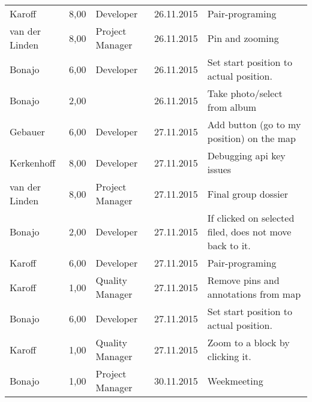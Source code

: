 \begin{longtable}{ l r p{2cm} c p{4cm} }
		Karoff                  & 8,00           & Developer             & 26.11.2015    & Pair-programing                                                                  \\
		van der Linden          & 8,00           & Project Manager       & 26.11.2015    & Pin and zooming                                                                 \\
		Bonajo                  & 6,00           & Developer             & 26.11.2015    & Set start position to actual position.                                          \\
		Bonajo                  & 2,00           &                       & 26.11.2015    & Take photo/select from album                                                    \\
		Gebauer                 & 6,00           & Developer             & 27.11.2015    & Add button (go to my position) on the map                                       \\
		Kerkenhoff              & 8,00           & Developer             & 27.11.2015    & Debugging api key issues                                                        \\
		van der Linden          & 8,00           & Project Manager       & 27.11.2015    & Final group dossier                                                             \\
		Bonajo                  & 2,00           & Developer             & 27.11.2015    & If clicked on selected filed, does not move back to it.                         \\
		Karoff                  & 6,00           & Developer             & 27.11.2015    & Pair-programing                                                                  \\
		Karoff                  & 1,00           & Quality Manager       & 27.11.2015    & Remove pins and annotations from map                                            \\
		Bonajo                  & 6,00           & Developer             & 27.11.2015    & Set start position to actual position.                                          \\
		Karoff                  & 1,00           & Quality Manager       & 27.11.2015    & Zoom to a block by clicking it.                                                 \\
		Bonajo                  & 1,00           & Project Manager       & 30.11.2015    & Weekmeeting                                                                     \\

\end{longtable}
